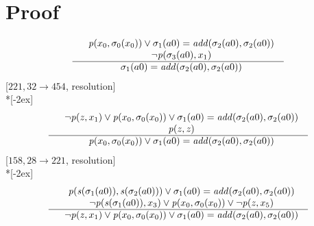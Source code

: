 \documentclass[fleqn]{article}
\newenvironment{VampireProof}{%
   \section{Proof}}{}
\newenvironment{VampireInference}{%
   \begin{array}{c}}{\end{array}}
\newenvironment{VampirePremise}%
   {\begin{array}{l}}%
   {\end{array}}
\newenvironment{VampireConclusion}%
   {\begin{array}{l}}%
   {\end{array}}
\newcommand{\VPremiseSeparator}{\\}
\newcommand{\VConclusionSeparator}{\\ \hline}
\newcommand{\Vor}{\vee}
\begin{document}
\begin{VampireProof}
\[\begin{VampireInference}
\begin{VampirePremise}
~~\mathit{p} (x_{0},\sigma_{0}(x_{0})) \Vor \sigma_{1}(a0) = \mathit{add} (\sigma_{2}(a0),\sigma_{2}(a0))
\end{VampirePremise}
\VPremiseSeparator
\begin{VampirePremise}%
~~\neg \mathit{p} (\sigma_{3}(a0),x_{1})
\end{VampirePremise}
\VConclusionSeparator
\begin{VampireConclusion}
~~\sigma_{1}(a0) = \mathit{add} (\sigma_{2}(a0),\sigma_{2}(a0))
\end{VampireConclusion}
\end{VampireInference}
\]
[$221,32\rightarrow 454$, resolution]\\*[-2ex]
\[\begin{VampireInference}
\begin{VampirePremise}%
~~\neg \mathit{p} (\mathit{z},x_{1}) \Vor \mathit{p} (x_{0},\sigma_{0}(x_{0})) \Vor \sigma_{1}(a0) = \mathit{add} (\sigma_{2}(a0),\sigma_{2}(a0))
\end{VampirePremise}
\VPremiseSeparator
\begin{VampirePremise}%
~~\mathit{p} (\mathit{z},\mathit{z})
\end{VampirePremise}
\VConclusionSeparator
\begin{VampireConclusion}
~~\mathit{p} (x_{0},\sigma_{0}(x_{0})) \Vor \sigma_{1}(a0) = \mathit{add} (\sigma_{2}(a0),\sigma_{2}(a0))
\end{VampireConclusion}
\end{VampireInference}
\]
[$158,28\rightarrow 221$, resolution]\\*[-2ex]
\[\begin{VampireInference}
\begin{VampirePremise}%
~~\mathit{p} (\mathit{s} (\sigma_{1}(a0)),\mathit{s} (\sigma_{2}(a0))) \Vor \sigma_{1}(a0) = \mathit{add} (\sigma_{2}(a0),\sigma_{2}(a0))
\end{VampirePremise}
\VPremiseSeparator
\begin{VampirePremise}%
~~\neg \mathit{p} (\mathit{s} (\sigma_{1}(a0)),x_{3}) \Vor \mathit{p} (x_{0},\sigma_{0}(x_{0})) \Vor \neg \mathit{p} (\mathit{z},x_{5})
\end{VampirePremise}
\VConclusionSeparator
\begin{VampireConclusion}
~~\neg \mathit{p} (\mathit{z},x_{1}) \Vor \mathit{p} (x_{0},\sigma_{0}(x_{0})) \Vor \sigma_{1}(a0) = \mathit{add} (\sigma_{2}(a0),\sigma_{2}(a0))
\end{VampireConclusion}
\end{VampireInference}
\]
\end{VampireProof}
\end{document}
